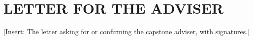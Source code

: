 \chapter{LETTER FOR THE ADVISER}
[Insert: The letter asking for or confirming the capstone adviser, with signatures.]
